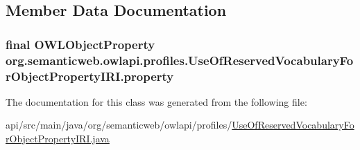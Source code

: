 \subsection{Member Data Documentation}
\hypertarget{classorg_1_1semanticweb_1_1owlapi_1_1profiles_1_1_use_of_reserved_vocabulary_for_object_property_i_r_i_ab4e3f4edca6000d809a14ff228c35da3}{
\subsubsection[{property}]{\setlength{\rightskip}{0pt plus 5cm}final {\bf O\-W\-L\-Object\-Property} org.\-semanticweb.\-owlapi.\-profiles.\-Use\-Of\-Reserved\-Vocabulary\-For\-Object\-Property\-I\-R\-I.\-property\hspace{0.3cm}{\ttfamily [private]}}}\label{classorg_1_1semanticweb_1_1owlapi_1_1profiles_1_1_use_of_reserved_vocabulary_for_object_property_i_r_i_ab4e3f4edca6000d809a14ff228c35da3}


The documentation for this class was generated from the following file\-:\begin{DoxyCompactItemize}
\item 
api/src/main/java/org/semanticweb/owlapi/profiles/\hyperlink{_use_of_reserved_vocabulary_for_object_property_i_r_i_8java}{Use\-Of\-Reserved\-Vocabulary\-For\-Object\-Property\-I\-R\-I.\-java}\end{DoxyCompactItemize}
